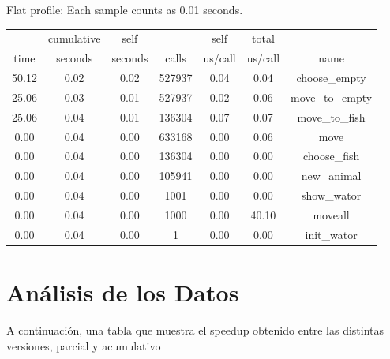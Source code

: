 \documentclass[a4paper,10pt]{article}
\begin{document}
Flat profile:
Each sample counts as 0.01 seconds.
\begin{center}
  \begin{tabular}{| c | c | c | c | c | c | c |}
    \hline
	&   cumulative &   self &   &              self &     total &     \\           
 time 	&   seconds &   seconds &    calls &  us/call &   us/call &   name \\ \hline    
 50.12 &      0.02 &     0.02 &   527937 &     0.04 &      0.04 &   choose\_empty \\ \hline
 25.06 &      0.03 &     0.01 &   527937 &     0.02 &      0.06 &   move\_to\_empty \\ \hline
 25.06 &      0.04 &     0.01 &   136304 &     0.07 &      0.07 &   move\_to\_fish \\ \hline
  0.00 &      0.04 &     0.00 &   633168 &     0.00 &      0.06 &   move \\ \hline
  0.00 &      0.04 &     0.00 &   136304 &     0.00 &      0.00 &   choose\_fish \\ \hline
  0.00 &      0.04 &     0.00 &   105941 &     0.00 &      0.00 &   new\_animal \\ \hline
  0.00 &      0.04 &     0.00 &     1001 &     0.00 &      0.00 &   show\_wator \\ \hline
  0.00 &      0.04 &     0.00 &     1000 &     0.00 &     40.10 &   moveall \\ \hline
  0.00 &      0.04 &     0.00 &        1 &     0.00 &      0.00 &   init\_wator \\ \hline
  
  \end{tabular}
\end{center}
 

\newpage

\section{An\'alisis de los Datos}

    A continuaci\'on, una tabla que muestra el speedup obtenido entre las distintas versiones, parcial y acumulativo
\end{document}
